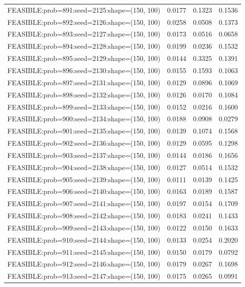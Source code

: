 \begin{longtable}{lccc}
FEASIBLE:prob=891:seed=2125:shape=(150, 100) & 0.0177 & 0.1323 & 0.1536 \\
FEASIBLE:prob=892:seed=2126:shape=(150, 100) & 0.0258 & 0.0508 & 0.1373 \\
FEASIBLE:prob=893:seed=2127:shape=(150, 100) & 0.0173 & 0.0516 & 0.0658 \\
FEASIBLE:prob=894:seed=2128:shape=(150, 100) & 0.0199 & 0.0236 & 0.1532 \\
FEASIBLE:prob=895:seed=2129:shape=(150, 100) & 0.0144 & 0.3325 & 0.1391 \\
FEASIBLE:prob=896:seed=2130:shape=(150, 100) & 0.0155 & 0.1593 & 0.1063 \\
FEASIBLE:prob=897:seed=2131:shape=(150, 100) & 0.0129 & 0.0896 & 0.1069 \\
FEASIBLE:prob=898:seed=2132:shape=(150, 100) & 0.0126 & 0.0170 & 0.1084 \\
FEASIBLE:prob=899:seed=2133:shape=(150, 100) & 0.0152 & 0.0216 & 0.1600 \\
FEASIBLE:prob=900:seed=2134:shape=(150, 100) & 0.0188 & 0.0908 & 0.0279 \\
FEASIBLE:prob=901:seed=2135:shape=(150, 100) & 0.0139 & 0.1074 & 0.1568 \\
FEASIBLE:prob=902:seed=2136:shape=(150, 100) & 0.0129 & 0.0595 & 0.1298 \\
FEASIBLE:prob=903:seed=2137:shape=(150, 100) & 0.0144 & 0.0186 & 0.1656 \\
FEASIBLE:prob=904:seed=2138:shape=(150, 100) & 0.0127 & 0.0514 & 0.1532 \\
FEASIBLE:prob=905:seed=2139:shape=(150, 100) & 0.0111 & 0.0139 & 0.1425 \\
FEASIBLE:prob=906:seed=2140:shape=(150, 100) & 0.0163 & 0.0189 & 0.1587 \\
FEASIBLE:prob=907:seed=2141:shape=(150, 100) & 0.0197 & 0.0154 & 0.1709 \\
FEASIBLE:prob=908:seed=2142:shape=(150, 100) & 0.0183 & 0.0241 & 0.1433 \\
FEASIBLE:prob=909:seed=2143:shape=(150, 100) & 0.0122 & 0.0150 & 0.1633 \\
FEASIBLE:prob=910:seed=2144:shape=(150, 100) & 0.0133 & 0.0254 & 0.2020 \\
FEASIBLE:prob=911:seed=2145:shape=(150, 100) & 0.0150 & 0.0179 & 0.0792 \\
FEASIBLE:prob=912:seed=2146:shape=(150, 100) & 0.0179 & 0.0267 & 0.1698 \\
FEASIBLE:prob=913:seed=2147:shape=(150, 100) & 0.0175 & 0.0265 & 0.0991 \\

\end{longtable}
